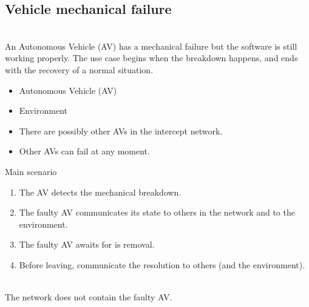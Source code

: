 \documentclass{memoir}
\begin{document}
\subsection{Vehicle mechanical failure}
\begin{description}
	\addtolength{\itemindent}{0.5cm}
	\item[Brief Description] \hfill \\
	An Autonomous Vehicle (AV) has a mechanical failure but the software is still working properly. The use case begins when the breakdown happens, and ends with the recovery of a normal situation.
	
	\item[Actors] \hfill
	\begin{itemize}
		\item Autonomous Vehicle (AV)
		\item Environment
	\end{itemize}
	
	\item[Preconditions] \hfill
	\begin{itemize}
		\item There are possibly other AVs in the intercept network.
		\item Other AVs can fail at any moment.
	\end{itemize}
	
	\item[Scenarios] \hfill
	\begin{description}
		\item Main scenario
		\begin{enumerate}
			\item The AV detects the mechanical breakdown.
			\item The faulty AV communicates its state to others in the network and to the environment.
			\item The faulty AV awaits for is removal.
			\item Before leaving, communicate the resolution to others (and the environment).
		\end{enumerate}
	\end{description}
	
	\item[Postconditions] \hfill \\
	The network does not contain the faulty AV.
\end{description}
\end{document}

